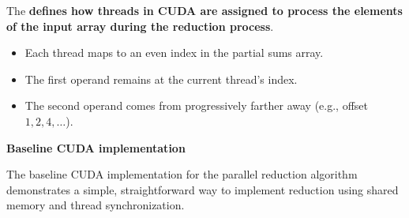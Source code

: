 \highspace
The  \textbf{defines how threads in CUDA are assigned to process the elements of the input array during the reduction process}.
\begin{itemize}
    \item Each thread maps to an even index in the partial sums array.
    \item The first operand remains at the current thread's index.
    \item The second operand comes from progressively farther away (e.g., offset $1, 2, 4, \ldots$).
\end{itemize}

\newpage

\begin{flushleft}
    \textcolor{Green3}{ \textbf{Baseline CUDA implementation}}
\end{flushleft}
The baseline CUDA implementation for the parallel reduction algorithm demonstrates a simple, straightforward way to implement reduction using shared memory and thread synchronization.

